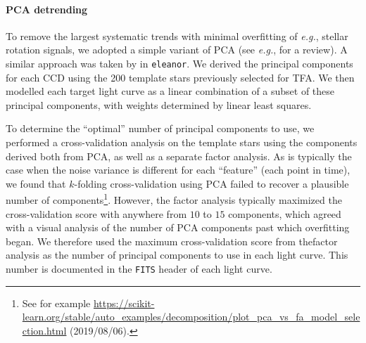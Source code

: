 \documentclass[12pt,twocolumn,tighten]{aastex62}
\begin{document}
\paragraph{PCA detrending}

To remove the largest systematic trends with minimal overfitting of
{\it e.g.}, stellar rotation signals, we adopted a simple variant of
PCA (see {\it e.g.}, \citealt{ivezic_statistics_2014} for a review).
A similar approach was taken by \citet{feinstein_eleanor_2019} in
\texttt{eleanor}.  We derived the principal components for each CCD
using the 200 template stars previously selected for TFA.  We then
modelled each target light curve as a linear combination of a subset
of these principal components, with weights determined by linear least
squares.

To determine the ``optimal'' number of principal components to use, we
performed a cross-validation analysis on the template stars using the
components derived both from PCA, as well as a separate factor
analysis.  As is typically the case when the noise variance is
different for each ``feature'' (each point in time), we found that
$k$-folding cross-validation using PCA failed to recover a plausible
number of components\footnote{See for example
\url{https://scikit-learn.org/stable/auto_examples/decomposition/plot_pca_vs_fa_model_selection.html}
 (2019/08/06).}.
However, the factor analysis typically maximized the cross-validation
score with anywhere from $10$ to $15$ components, which agreed with a
visual analysis of the number of PCA components past which overfitting
began.  We therefore used the maximum cross-validation score from
thefactor analysis as the number of principal components to use in
each light curve.  This number is documented in the \texttt{FITS}
header of each light curve.

% 
\end{document}

